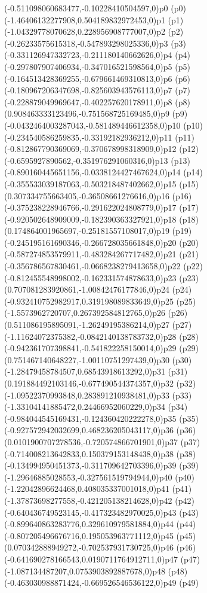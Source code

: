 \psPoint(-0.511098060683477,-0.10228410504597,0){p0}
\psdot(p0)
\psPoint(-1.46406132277908,0.504189832972453,0){p1}
\psdot(p1)
\psPoint(-1.04329778070628,0.228956908777007,0){p2}
\psdot(p2)
\psPoint(-0.26233575615318,-0.547893298025336,0){p3}
\psdot(p3)
\psPoint(-0.331126947332723,-0.211180140662626,0){p4}
\psdot(p4)
\psPoint(-0.297807907406934,-0.347016521598564,0){p5}
\psdot(p5)
\psPoint(-0.164513428369255,-0.679661469310813,0){p6}
\psdot(p6)
\psPoint(-0.180967206347698,-0.825603943576113,0){p7}
\psdot(p7)
\psPoint(-0.228879049969647,-0.402257620178911,0){p8}
\psdot(p8)
\psPoint(0.908463333123496,-0.751568725169485,0){p9}
\psdot(p9)
\psPoint(-0.0432464003287043,-0.581489446612358,0){p10}
\psdot(p10)
\psPoint(-0.234540586259835,-0.33192182936212,0){p11}
\psdot(p11)
\psPoint(-0.812867790369069,-0.370678998318909,0){p12}
\psdot(p12)
\psPoint(-0.6595927890562,-0.351976291060316,0){p13}
\psdot(p13)
\psPoint(-0.890160445651156,-0.0338124427467624,0){p14}
\psdot(p14)
\psPoint(-0.355533039187063,-0.503218487402662,0){p15}
\psdot(p15)
\psPoint(0.307334755663405,-0.36508661276616,0){p16}
\psdot(p16)
\psPoint(-0.375238228946766,-0.291622024808779,0){p17}
\psdot(p17)
\psPoint(-0.920502648909009,-0.182390363327921,0){p18}
\psdot(p18)
\psPoint(0.174864001965697,-0.25181557108017,0){p19}
\psdot(p19)
\psPoint(-0.245195161690346,-0.266728035661848,0){p20}
\psdot(p20)
\psPoint(-0.587274853579911,-0.483284267717482,0){p21}
\psdot(p21)
\psPoint(-0.356786567830461,-0.0668238279413658,0){p22}
\psdot(p22)
\psPoint(-0.812455548998002,-0.162331574878633,0){p23}
\psdot(p23)
\psPoint(0.707081283920861,-1.00842476177846,0){p24}
\psdot(p24)
\psPoint(-0.932410752982917,0.319198089833649,0){p25}
\psdot(p25)
\psPoint(-1.5573962720707,0.267392584812765,0){p26}
\psdot(p26)
\psPoint(0.511086195895091,-1.26249195386214,0){p27}
\psdot(p27)
\psPoint(-1.11624072375382,-0.0842140138783732,0){p28}
\psdot(p28)
\psPoint(-0.942361707398841,-0.541822258150014,0){p29}
\psdot(p29)
\psPoint(0.751467140648227,-1.00110751297439,0){p30}
\psdot(p30)
\psPoint(-1.28479458784507,0.68543918613292,0){p31}
\psdot(p31)
\psPoint(0.191884492103146,-0.677490544374357,0){p32}
\psdot(p32)
\psPoint(-1.09522370993848,0.283891210938481,0){p33}
\psdot(p33)
\psPoint(-1.33104141885472,0.24466952060229,0){p34}
\psdot(p34)
\psPoint(-0.984044545169431,-0.124360420222278,0){p35}
\psdot(p35)
\psPoint(-0.927572942032699,0.468236205043117,0){p36}
\psdot(p36)
\psPoint(0.0101900707278536,-0.720574866701901,0){p37}
\psdot(p37)
\psPoint(-0.714008213642833,0.150379153148438,0){p38}
\psdot(p38)
\psPoint(-0.134994950451373,-0.311709642703396,0){p39}
\psdot(p39)
\psPoint(-1.29646885028553,-0.327561519794944,0){p40}
\psdot(p40)
\psPoint(-1.22042896624468,0.408035337001018,0){p41}
\psdot(p41)
\psPoint(-1.37873698277558,-0.421205138214628,0){p42}
\psdot(p42)
\psPoint(-0.640436749523145,-0.417323482970025,0){p43}
\psdot(p43)
\psPoint(-0.899640863283776,0.329610979581884,0){p44}
\psdot(p44)
\psPoint(-0.807205496676716,0.195053963771112,0){p45}
\psdot(p45)
\psPoint(0.070342888949272,-0.702537931730725,0){p46}
\psdot(p46)
\psPoint(-0.641690278166543,0.0190711764912711,0){p47}
\psdot(p47)
\psPoint(-1.087134487207,0.0753903892887678,0){p48}
\psdot(p48)
\psPoint(-0.463030988871424,-0.669526546536122,0){p49}
\psdot(p49)
